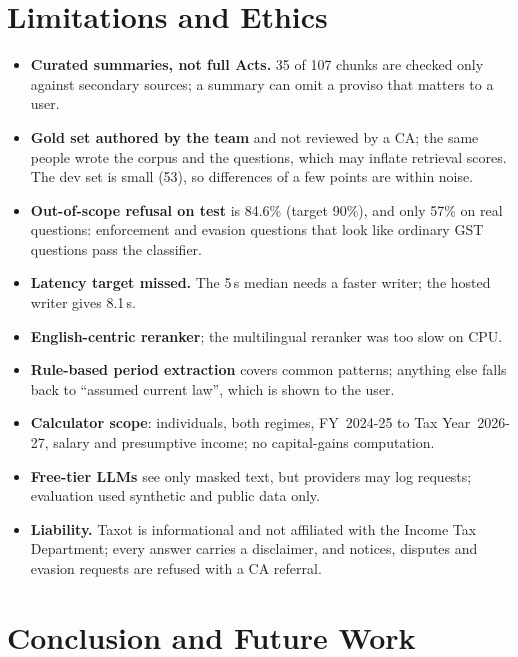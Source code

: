 \documentclass[conference]{IEEEtran}
\begin{document}
\section{Limitations and Ethics}

\begin{itemize}
\item \textbf{Curated summaries, not full Acts.} 35 of 107 chunks are checked only against secondary
sources; a summary can omit a proviso that matters to a user.
\item \textbf{Gold set authored by the team} and not reviewed by a CA; the same people wrote the corpus and the
questions, which may inflate retrieval scores. The dev set is small (53), so differences of a few points are
within noise.
\item \textbf{Out-of-scope refusal on test} is 84.6\% (target 90\%), and only 57\% on real questions: enforcement and evasion
questions that look like ordinary GST questions pass the classifier.
\item \textbf{Latency target missed.} The 5\,s median needs a faster writer; the hosted writer gives 8.1\,s.
\item \textbf{English-centric reranker}; the multilingual reranker was too slow on CPU.
\item \textbf{Rule-based period extraction} covers common patterns; anything else falls back to ``assumed current
law'', which is shown to the user.
\item \textbf{Calculator scope}: individuals, both regimes, FY~2024-25 to Tax Year~2026-27, salary and presumptive
income; no capital-gains computation.
\item \textbf{Free-tier LLMs} see only masked text, but providers may log requests; evaluation used synthetic
and public data only.
\item \textbf{Liability.} Taxot is informational and not affiliated with the Income Tax Department; every answer
carries a disclaimer, and notices, disputes and evasion requests are refused with a CA referral.
\end{itemize}

\section{Conclusion and Future Work}
\end{document}
